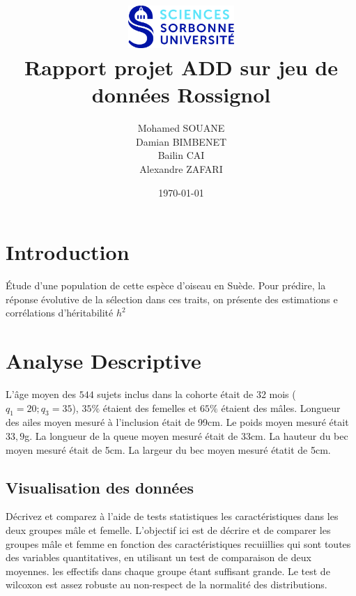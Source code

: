 \documentclass[12pt, twocolumn]{article}
\begin{document}
\title{\includegraphics[width=4cm]{LOGO_SCIENCES_DEF_CMJN.jpg}\\Rapport projet ADD sur jeu de donn\'ees Rossignol}
\author{Mohamed SOUANE\\
        Damian BIMBENET\\
        Bailin CAI\\
        Alexandre ZAFARI\\
}
\date{\today}
\maketitle

\section{Introduction}

\'Etude d'une population de cette espèce d'oiseau en Suède. Pour prédire, la réponse
évolutive de la sélection dans ces traits, on présente des estimations e corrélations d'héritabilité $h^2$

\section{Analyse Descriptive}

L'âge moyen des $544$ sujets inclus dans la cohorte était de 32 mois ($q_1 = 20; q_3 = 35$), $35\%$ étaient des femelles et $65\%$ étaient des mâles.
Longueur des ailes moyen mesuré à l'inclusion était de 99cm. Le poids moyen mesuré était $33,9$g. La longueur de la queue moyen mesuré était de 33cm. La hauteur du bec
moyen mesuré était de 5cm. La largeur du bec moyen mesuré étatit de 5cm.


\subsection{Visualisation des données}
Décrivez et comparez à l'aide de tests statistiques les caractéristiques dans les deux groupes mâle et femelle. L'objectif ici est de décrire et de comparer les groupes
mâle et femme en fonction des caractéristiques recuiillies qui sont toutes des variables quantitatives, en utilisant un test de comparaison de deux moyennes. les effectifs dans 
chaque groupe étant suffisant grande. Le test de wilcoxon est assez robuste au non-respect de la normalité des distributions.
\end{document}
